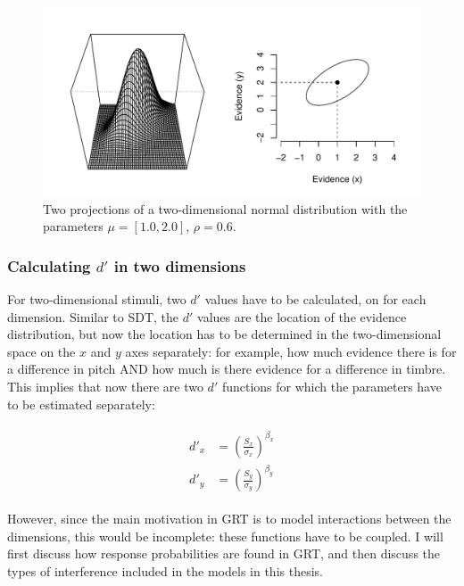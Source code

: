 \documentclass{article}\usepackage{knitr}
\begin{document}
\begin{figure}
\centering
\begin{knitrout}
\color{fgcolor}
\includegraphics[width=\maxwidth]{figure/unnamed-chunk-8-1} 
\end{knitrout}
\caption{Two projections of a two-dimensional normal distribution with the parameters $\mu = [1.0, 2.0]$, $\rho = 0.6$.} 
\label{fig:2dimnorm}
\end{figure}

\subsubsection{Calculating $d'$ in two dimensions}

For two-dimensional stimuli, two $d'$ values have to be calculated, on for each dimension. Similar to SDT, the $d'$ values are the location of the evidence distribution, but now the location has to be determined in the two-dimensional space on the $x$ and $y$ axes separately: for example, how much evidence there is for a difference in pitch AND how much is there evidence for a difference in timbre. This implies that now there are two $d'$ functions for which the parameters have to be estimated separately: 

\begin{align}
\label{eq:twodimdprime}
\begin{split}
d'_x &= (\frac{S_x}{\sigma_x})^{\beta_x}\\
d'_y &= (\frac{S_y}{\sigma_y})^{\beta_y}
\end{split}
\end{align}

However, since the main motivation in GRT is to model interactions between the dimensions, this would be incomplete: these functions have to be coupled. I will first discuss how response probabilities are found in GRT, and then discuss the types of interference included in the models in this thesis.
\end{document}
